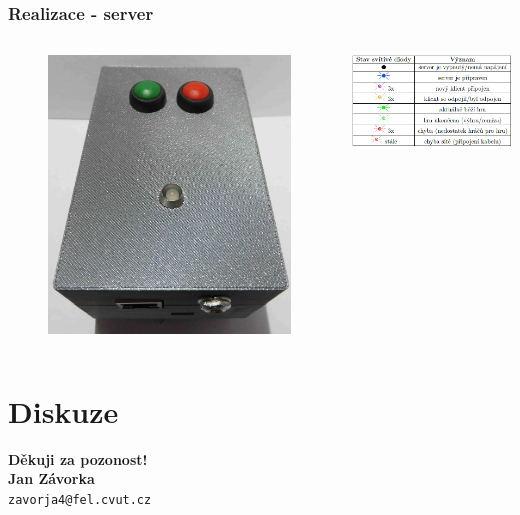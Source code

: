 \documentclass{beamer}
\makeatletter
\newcommand\FirstName{Jan}
\newcommand\LastName{Závorka}
\newcommand\Email{zavorja4@fel.cvut.cz}
\makeatother
\begin{document}
\begin{frame}
\frametitle{Realizace - server}
\begin{columns}[c]
	\begin{figure}
		\centering
		\includegraphics[width=\textwidth]{img/server_realizace.jpg}
	\end{figure}
%
	\begin{table}
		\centering
		\includegraphics[width=\textwidth]{img/serverLED.png}
	\end{table}
\end{columns}
\end{frame}


\section{Diskuze}
\begin{frame}
\begin{center}
\vspace*{1cm}
{\bf Děkuji za pozonost!}\\
\vspace*{2cm}
{\bf\Large \FirstName{} \LastName{}}\\
{\tt \Email}
\vspace*{1cm}
\end{center}
\end{frame}
\end{document}
